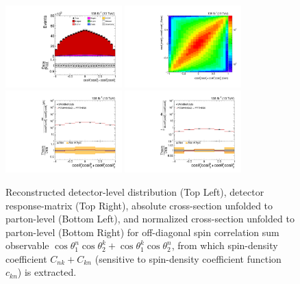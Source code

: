 \clearpage
\begin{figure}[htb]
\begin{center}
 \includegraphics[width=0.40\textwidth]{fig_fullRun2UL/controlplots/combined/Hyp_LLBarCPnk.pdf}
 \includegraphics[width=0.40\textwidth]{fig_fullRun2UL/unfolding/combined/ResponseMatrix_c_Pnk.pdf} \\
 \includegraphics[width=0.40\textwidth]{fig_fullRun2UL/unfolding/combined/UnfoldedResults_c_Pnk.pdf}
 \includegraphics[width=0.40\textwidth]{fig_fullRun2UL/unfolding/combined/UnfoldedResultsNorm_c_Pnk.pdf} \\
\label{fig:c_Pnk}
\caption{Reconstructed detector-level distribution (Top Left), detector response-matrix (Top Right), absolute cross-section unfolded to parton-level (Bottom Left), and normalized cross-section unfolded to parton-level (Bottom Right) for off-diagonal spin correlation sum observable $\cos\theta_{1}^{n}\cos\theta_{2}^{k}+\cos\theta_{1}^{k}\cos\theta_{2}^{n}$, from which spin-density coefficient $C_{nk}+C_{kn}$ (sensitive to spin-density coefficient function $c_{k n}$) is extracted.}
\end{center}
\end{figure}
